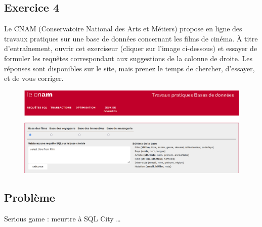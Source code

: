\documentclass[
  a4paper,
  DIV=11,
  numbers=noendperiod]{scrartcl}
\begin{document}
\hypertarget{fa-desktop-exercice-4}{%
\subsection{\texorpdfstring{ Exercice
4}{ Exercice 4}}\label{fa-desktop-exercice-4}}

Le CNAM (Conservatoire National des Arts et Métiers) propose en ligne
des travaux pratiques sur une base de données concernant les films de
cinéma. À titre d'entraînement, ouvrir cet exerciseur (cliquer sur
l'image ci-dessous) et essayer de formuler les requêtes correspondant
aux suggestions de la colonne de droite. Les réponses sont disponibles
sur le site, mais prenez le temps de chercher, d'essayer, et de vous
corriger.

\begin{figure}

{\centering 

\href{https://deptfod.cnam.fr/bd/tp/}{\includegraphics{CNAM_SQL.png}}

}

\end{figure}

\hypertarget{fa-desktop-probluxe8me}{%
\subsection{\texorpdfstring{
Problème}{ Problème}}\label{fa-desktop-probluxe8me}}

Serious game : meurtre à SQL City \ldots{}
\end{document}
